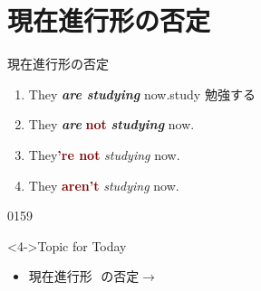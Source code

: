 \documentclass[aspectratio=169,xcolor={dvipsnames,table}]{beamer}
\newcommand{\myaudio}[1]{\href{#1}{\faVolumeUp}}
\begin{document}
\section{現在進行形の否定}
\begin{frame}[plain]{現在進行形の否定}
\Large

\begin{enumerate}
 \item<2-> They {\itshape\bfseries are studying} now.\hfill{\scriptsize study  勉強する}
 \item<3-> They {\itshape\bfseries are} \textcolor{Maroon}{\bfseries not} {\itshape\bfseries studying} now.\\
 \item<5-> They\textcolor{Maroon}{\bfseries 're not} {\itshape studying} now.
 \item<6-> They \textcolor{Maroon}{\bfseries aren't} {\itshape studying} now.
\end{enumerate}

\vfill

\hfill{\tiny 0159}\,{\scriptsize \myaudio{audio/022_is_ing_negative_01.mp3}}

\begin{block}<4->{Topic for Today}\small
\begin{itemize}[square]
 \item  現在進行形\,\,\,\,の否定$\longrightarrow$\,\,%
\end{itemize}
\end{block}
\hfill{}
\end{frame}
\end{document}
